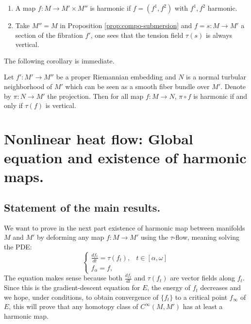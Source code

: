 \begin{exampl}
\begin{enumerate}
\item A map \(f: M \longrightarrow M'\times M''\) is harmonic if \(f=(f^1, f^2)\) with \(f^1, f^2\) harmonic.
\item Take \(M''=M\) in Proposition \ref{prop:compo-submersion} and \(f=s: M \longrightarrow M'\) a
section of the fibration \(f'\), one sees that the tension field \(\tau(s)\) is
always vertical.
\end{enumerate}
\end{exampl}

The following corollary is immediate.
\begin{corollary}
\label{cor:compo-with-submersion}
Let \(f': M' \longrightarrow M''\) be a proper Riemannian embedding and \(N\) is a
normal turbular neighborhood of \(M'\) which can be seen as a smooth fiber bundle over
\(M'\). Denote by \(\pi: N \longrightarrow M'\) the projection. Then for all map \(f:
M \longrightarrow N\), \(\pi\circ f\) is harmonic if and only if \(\tau(f)\) is vertical. 
\end{corollary}

\fi



\section{Nonlinear heat flow: Global equation and existence of harmonic maps.}
\label{sec:orgfa2e36f}
\subsection{Statement of the main results.}
\label{sec:org86fcbda}

We want to prove in the next part existence of harmonic map between manifolds \(M\)
and \(M'\) by deforming any map \(f: M
\longrightarrow M'\) using the \(\tau\)-flow, meaning solving the PDE:
\begin{equation}
\label{eq:loc-heat-flow}
\begin{cases}
\frac{d f_t}{d t} = \tau (f_t),  & t\in [\alpha,\omega] \\
f_\alpha = f, & 
\end{cases}
\end{equation}
The equation makes sense because both \(\frac{d f_t}{d t}\) and \(\tau (f_t)\) are
vector fields along \(f_t\). Since this is the gradient-descent equation for \(E\),
the energy of \(f_t\) decreases and we hope, under conditions, to obtain
convergence of \(\{f_t\}\) to a critical point \(f_\infty\) of \(E\), this will prove
that any homotopy class of \(C^\infty(M,M')\) has at least a harmonic map.

